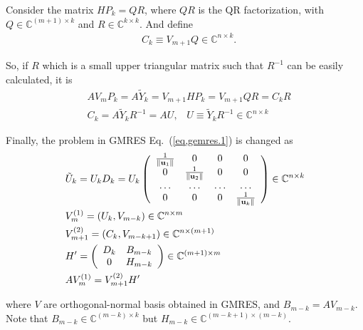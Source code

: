 Consider the matrix $HP_k=QR$, where $QR$ is the QR factorization, with $Q\in \mathbb{C}^{(m+1)\times k}$ and $R\in \mathbb{C}^{k\times k}$. And define
\begin{equation}
\begin{split}
&C_k\equiv V_{m+1}Q\in \mathbb{C}^{n\times k}.
\end{split}
\end{equation}

So, if $R$ which is a small upper triangular matrix such that $R^{-1}$ can be easily calculated, it is
\begin{equation}
\begin{split}
&AV_mP_k=A\tilde{Y}_k=V_{m+1}HP_k=V_{m+1}QR=C_kR\\
&C_k=A\tilde{Y}_kR^{-1}=A U,\;\;\;U\equiv \tilde{Y}_kR^{-1} \in \mathbb{C}^{n\times k}
\end{split}
\end{equation}

Finally, the problem in GMRES Eq.~(\ref{eq,gemres.1}) is changed as
\begin{equation}
\begin{split}
&\tilde{U}_k=U_kD_k=U_k\left(\begin{array}{cccc}
\frac{1}{\|{\bf u}_1\|} & 0 & 0 & 0 \\
0 & \frac{1}{\|{\bf u}_2\|} & 0 & 0 \\
\ldots & \ldots & \ldots & \ldots \\
0 & 0 & 0 & \frac{1}{\|{\bf u}_k\|} \\ 
\end{array}\right) \in \mathbb{C}^{n\times k}\\
&V^{(1)}_m=(U_k, V_{m-k})\in \mathbb{C}^{n\times m}\\
&V^{(2)}_{m+1}=(C_k, V_{m-k+1})\in \mathbb{C}^{n\times (m+1)}\\
&H'=\left(\begin{array}{cc}
D_k & B_{m-k} \\
0 & H_{m-k} 
\end{array}\right) \in \mathbb{C}^{(m+1)\times m}\\
&AV^{(1)}_m=V^{(2)}_{m+1}H'\\
\end{split}
\label{eq.gcrodr.1}
\end{equation}

where $V$ are orthogonal-normal basis obtained in GMRES, and $B_{m-k}=AV_{m-k}$. Note that \textcolor[rgb]{0,0,1}{$B_{m-k}\in \mathbb{C}^{(m-k)\times k}$ but $H_{m-k}\in \mathbb{C}^{(m-k+1)\times (m-k)}$}.

